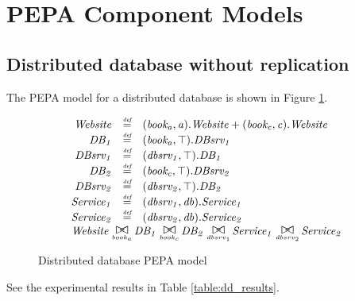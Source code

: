 %
%

\section{PEPA Component Models}

%
%
\subsection{Distributed database without replication}

The PEPA model for a distributed database is shown in Figure \ref{figure:pepa_dd_model}.

\begin{figure}
	\caption{Distributed database PEPA model}
	\label{figure:pepa_dd_model}
	\centering
	\begin{displaymath}
		\begin{array}{rcl}
			\mathit{Website} & \rmdef & (\mathit{book_a},\mathit{a}).\mathit{Website}+(\mathit{book_c},\mathit{c}).\mathit{Website}\\
			\mathit{DB_1} & \rmdef & (\mathit{book_a},\top).\mathit{DBsrv_1}\\
			\mathit{DBsrv_1} & \rmdef & (\mathit{dbsrv_1},\top).\mathit{DB_1}\\
			\mathit{DB_2} & \rmdef & (\mathit{book_c},\top).\mathit{DBsrv_2}\\
			\mathit{DBsrv_2} & \rmdef & (\mathit{dbsrv_2},\top).\mathit{DB_2}\\
			\mathit{Service_1} & \rmdef & (\mathit{dbsrv_1},\mathit{db}).\mathit{Service_1}\\
			\mathit{Service_2} & \rmdef & (\mathit{dbsrv_2},\mathit{db}).\mathit{Service_2}\\
	[0.0ex]		\multicolumn{3}{l}{\mathit{Website}\sync{book_a}\mathit{DB_1}\sync{book_c}\mathit{DB_2}\sync{dbsrv_1}\mathit{Service_1}\sync{dbsrv_2}\mathit{Service_2}}\\
	[0.0ex]	\end{array}
	\end{displaymath}
\end{figure}

See the experimental results in Table \ref{table:dd_results}.

